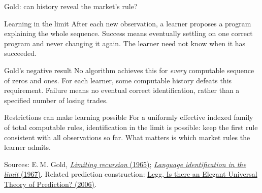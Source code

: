 \documentclass{beamer}
\newcommand{\doiref}[2]{%
  \href{https://doi.org/#1}{\textcolor{blue!65!black}{#2}}}
\newcommand{\sourcefoot}[1]{%
  \par\vfill{\fontsize{6.3}{7.5}\selectfont\color{black!65}Sources: #1\par}}
\begin{document}
\begin{frame}{Gold: can history reveal the market's rule?}
\small
\begin{block}{Learning in the limit}
After each new observation, a learner proposes a program explaining the
whole sequence. Success means eventually settling on one correct program
and never changing it again. The learner need not know when it has succeeded.
\end{block}
\begin{alertblock}{Gold's negative result}
No algorithm achieves this for \emph{every} computable sequence of zeros
and ones. For each learner, some computable history defeats this requirement.
Failure means no eventual correct identification, rather than a specified
number of losing trades.
\end{alertblock}
\begin{exampleblock}{Restrictions can make learning possible}
For a uniformly effective indexed family of total computable rules,
identification in the limit is possible: keep the first rule consistent
with all observations so far.
What matters is which market rules the learner admits.
\end{exampleblock}
\sourcefoot{E.\,M. Gold,
\doiref{10.2307/2270580}{\emph{Limiting recursion} (1965)};
\doiref{10.1016/S0019-9958(67)91165-5}{\emph{Language identification in the limit} (1967)}.
Related prediction construction: \doiref{10.48550/arXiv.cs/0606070}{Legg, Is there an Elegant Universal Theory of Prediction? (2006)}.}
\end{frame}
\end{document}

